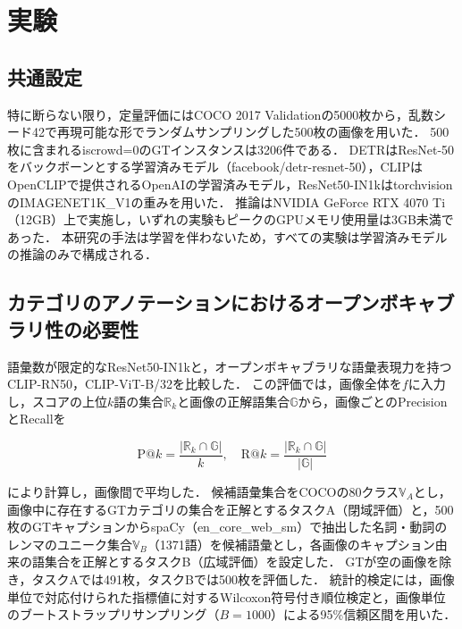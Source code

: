 \section{実験}
\subsection{共通設定}
特に断らない限り，定量評価にはCOCO 2017 Validation\cite{ref_COCO}の5000枚から，乱数シード42で再現可能な形でランダムサンプリングした500枚の画像を用いた．
500枚に含まれるiscrowd=0のGTインスタンスは3206件である．
DETRはResNet-50をバックボーンとする学習済みモデル（facebook/detr-resnet-50），CLIPはOpenCLIP\cite{ref_OpenCLIP}で提供されるOpenAIの学習済みモデル，ResNet50-IN1kはtorchvisionのIMAGENET1K\_V1の重みを用いた．
推論はNVIDIA GeForce RTX 4070 Ti（12GB）上で実施し，いずれの実験もピークのGPUメモリ使用量は3GB未満であった．
本研究の手法は学習を伴わないため，すべての実験は学習済みモデルの推論のみで構成される．

\subsection{カテゴリのアノテーションにおけるオープンボキャブラリ性の必要性}
語彙数が限定的なResNet50-IN1kと，オープンボキャブラリな語彙表現力を持つCLIP-RN50，CLIP-ViT-B/32を比較した．
この評価では，画像全体を$ f $に入力し，スコアの上位$ k $語の集合$ {\mathbb R}_k $と画像の正解語集合$ {\mathbb G} $から，画像ごとのPrecisionとRecallを

\begin{equation}
    \mathrm{P@}k = \frac{|{\mathbb R}_k \cap {\mathbb G}|}{k}, \quad
    \mathrm{R@}k = \frac{|{\mathbb R}_k \cap {\mathbb G}|}{|{\mathbb G}|}
    \label{eq_pr_at_k}
\end{equation}

\noindent
により計算し，画像間で平均した．
候補語彙集合をCOCOの80クラス$ {\mathbb V}_A $とし，画像中に存在するGTカテゴリの集合を正解とするタスクA（閉域評価）と，500枚のGTキャプションからspaCy\cite{ref_spaCy}（en\_core\_web\_sm）で抽出した名詞・動詞のレンマのユニーク集合$ {\mathbb V}_B $（1371語）を候補語彙とし，各画像のキャプション由来の語集合を正解とするタスクB（広域評価）を設定した．
GTが空の画像を除き，タスクAでは491枚，タスクBでは500枚を評価した．
統計的検定には，画像単位で対応付けられた指標値に対するWilcoxon符号付き順位検定\cite{ref_Wilcoxon}と，画像単位のブートストラップリサンプリング（$ B = 1000 $）による95\%信頼区間\cite{ref_Bootstrap}を用いた．

